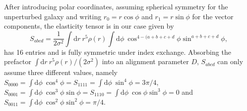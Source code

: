 \documentclass[a4paper,fleqn,usenatbib]{mnras}
\newcommand{\dd}{\mathrm{d}}
\begin{document}
After introducing polar coordinates, assuming spherical symmetry for the unperturbed galaxy and writing $r_0=r\cos\phi$ and $r_1=r\sin\phi$ for the vector components, the elasticity tensor is in our case given by
\begin{equation}
S_{abcd} = 
\frac{1}{2\sigma^2}\int\dd r\:r^5\rho(r)\int\dd\phi\:\cos^{4-(a+b+c+d}\phi\sin^{a+b+c+d}\phi,
\end{equation}
has 16 entries and is fully symmetric under index exchange. Absorbing the prefactor $\int\dd r\:r^5\rho(r)/(2\sigma^2)$ into an alignment parameter $D$, $S_{abcd}$ can only assume three different values, namely $S_{0000} = \int\dd\phi\:\cos^4\phi = S_{1111} = \int\dd\phi\:\sin^4\phi = 3\pi/4$, $S_{0001} = \int\dd\phi\:\cos^3\phi\sin\phi = S_{1110} = \int\dd\phi\:\cos\phi\sin^3\phi = 0$ and $S_{0011} = \int\dd\phi\:\cos^2\phi\sin^2\phi = \pi/4$. 
\end{document}
